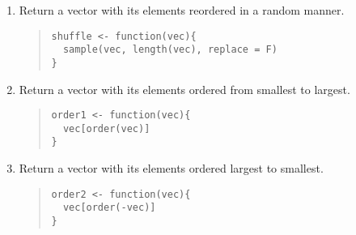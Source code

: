 \documentclass{article}
\begin{document}
\begin{enumerate}
\item Return a vector with its elements reordered in a random manner.
  \begin{quote}
    \begin{verbatim}
shuffle <- function(vec){
  sample(vec, length(vec), replace = F) 
}
    \end{verbatim}
  \end{quote}

\item Return a vector with its elements ordered from smallest to largest.
  \begin{quote}
    \begin{verbatim}
order1 <- function(vec){
  vec[order(vec)]
}
    \end{verbatim}
  \end{quote}

\item Return a vector with its elements ordered largest to smallest.
  \begin{quote}
    \begin{verbatim}
order2 <- function(vec){
  vec[order(-vec)]
}
    \end{verbatim}
  \end{quote}





\end{enumerate}
\end{document}
